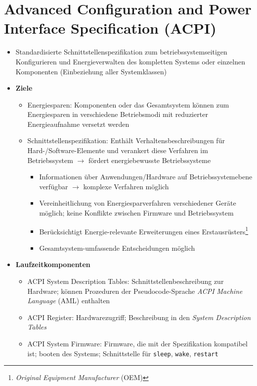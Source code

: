 \section{Advanced Configuration and Power Interface Specification (ACPI)}
\begin{itemize}
	\item Standardisierte Schnittstellenspezifikation zum betriebssystemseitigen Konfigurieren und Energieverwalten des kompletten Systems oder einzelnen Komponenten (Einbeziehung aller Systemklassen)
	\item \textbf{Ziele}
	\begin{itemize}
		\item Energiesparen: Komponenten oder das Gesamtsystem können zum Energiesparen in verschiedene Betriebsmodi mit reduzierter Energieaufnahme versetzt werden
		\item Schnittstellenspezifikation: Enthält Verhaltensbeschreibungen für Hard-/Software-Elemente und verankert diese Verfahren im Betriebssystem \(\rightarrow\) fördert energiebewusste Betriebssysteme
		\begin{itemize}
			\item Informationen über Anwendungen/Hardware auf Betriebssystemebene verfügbar \(\rightarrow\) komplexe Verfahren möglich
			\item Vereinheitlichung von Energiesparverfahren verschiedener Geräte möglich; keine Konflikte zwischen Firmware und Betriebssystem
			\item Berücksichtigt Energie-relevante Erweiterungen eines Erstausrüsters\footnote{\textit{Original Equipment Manufacturer} (OEM)}
			\item Gesamtsystem-umfassende Entscheidungen möglich
		\end{itemize}
	\end{itemize}
	\item \textbf{Laufzeitkomponenten}
	\begin{itemize}
		\item ACPI System Description Tables: Schnittstellenbeschreibung zur Hardware; können Prozeduren der Pseudocode-Sprache \textit{ACPI Machine Language} (AML) enthalten
		\item ACPI Register: Hardwarezugriff; Beschreibung in den \textit{System Description Tables}
		\item ACPI System Firmware: Firmware, die mit der Spezifikation kompatibel ist; booten des Systems; Schnittstelle für \texttt{sleep}, \texttt{wake}, \texttt{restart}
	\end{itemize}

\end{itemize}
